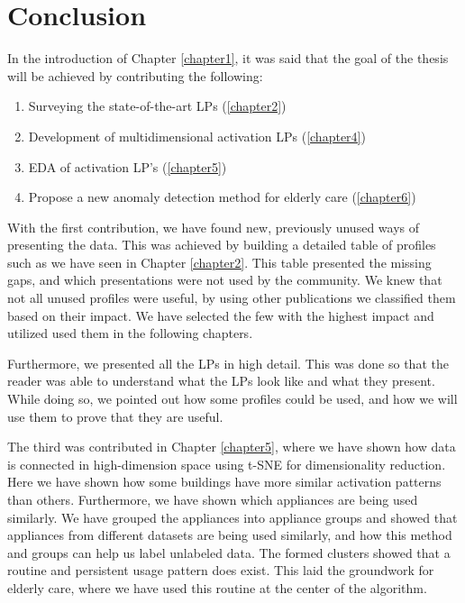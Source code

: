 \chapter{Conclusion}
\label{chapter7}

In the introduction of Chapter \ref{chapter1}, it was said that the goal of the thesis will be achieved by contributing the following:

\begin{enumerate}
	\item Surveying the state-of-the-art LPs (\ref{chapter2})
	\item Development of multidimensional activation LPs (\ref{chapter4})
	\item EDA of activation LP's (\ref{chapter5})
	\item Propose a new anomaly detection method for elderly care (\ref{chapter6})
\end{enumerate}

With the first contribution, we have found new, previously unused ways of presenting the data.
This was achieved by building a detailed table of profiles such as we have seen in Chapter \ref{chapter2}.
This table presented the missing gaps, and which presentations were not used by the community.
We knew that not all unused profiles were useful, by using other publications we classified them based on their impact. 
We have selected the few with the highest impact and utilized used them in the following chapters.

Furthermore, we presented all the LPs in high detail. This was done so that the reader was able to understand what the LPs look like and what they present.
While doing so, we pointed out how some profiles could be used, and how we will use them to prove that they are useful. 

The third was contributed in Chapter \ref{chapter5}, where we have shown how data is connected in high-dimension space
using t-SNE for dimensionality reduction. Here we have shown how some buildings have more similar activation patterns than others.
Furthermore, we have shown which appliances are being used similarly. 
We have grouped the appliances into appliance groups and showed that appliances from different datasets are being used similarly, and how this method and groups can help us label unlabeled data. 
The formed clusters showed that a routine and persistent usage pattern does exist. This laid the groundwork for elderly care, where we have used this routine at the center of the algorithm.

